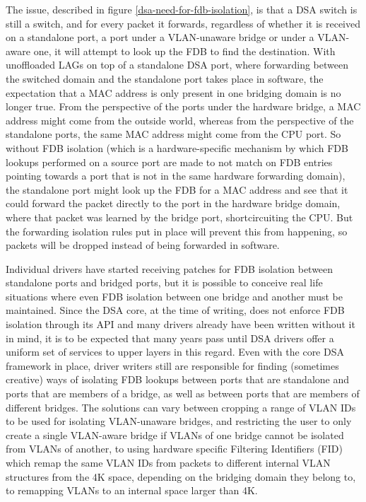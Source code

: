 \documentclass[letterpaper]{article}
\begin{document}
The issue, described in figure \ref{dsa-need-for-fdb-isolation}, is that a DSA switch is still a switch, and for every packet it
forwards, regardless of whether it is received on a standalone port, a port
under a VLAN-unaware bridge or under a VLAN-aware one, it will attempt to look
up the FDB to find the destination. With unoffloaded LAGs on top of a
standalone DSA port, where forwarding between the switched domain and the
standalone port takes place in software, the expectation that a MAC address is
only present in one bridging domain is no longer true. From the perspective of
the ports under the hardware bridge, a MAC address might come from the outside
world, whereas from the perspective of the standalone ports, the same MAC
address might come from the CPU port. So without FDB isolation (which is a
hardware-specific mechanism by which FDB lookups performed on a source port are
made to not match on FDB entries pointing towards a port that is not in the
same hardware forwarding domain), the standalone port might look up the FDB for
a MAC address and see that it could forward the packet directly to the port in
the hardware bridge domain, where that packet was learned by the bridge port,
shortcircuiting the CPU. But the forwarding isolation rules put in place will
prevent this from happening, so packets will be dropped instead of being
forwarded in software.

Individual drivers have started receiving patches for FDB isolation between
standalone ports and bridged ports, but it is possible to conceive real life
situations where even FDB isolation between one bridge and another must be
maintained. Since the DSA core, at the time of writing, does not enforce FDB
isolation through its API and many drivers already have been written without it
in mind, it is to be expected that many years pass until DSA drivers offer a
uniform set of services to upper layers in this regard. Even with the core DSA
framework in place, driver writers still are responsible for finding (sometimes
creative) ways of isolating FDB lookups between ports that are standalone and
ports that are members of a bridge, as well as between ports that are members
of different bridges. The solutions can vary between cropping a range of VLAN
IDs to be used for isolating VLAN-unaware bridges, and restricting the user to
only create a single VLAN-aware bridge if VLANs of one bridge cannot be
isolated from VLANs of another, to using hardware specific Filtering
Identifiers (FID) which remap the same VLAN IDs from packets to different
internal VLAN structures from the 4K space, depending on the bridging domain
they belong to, to remapping VLANs to an internal space larger than 4K.
\end{document}
